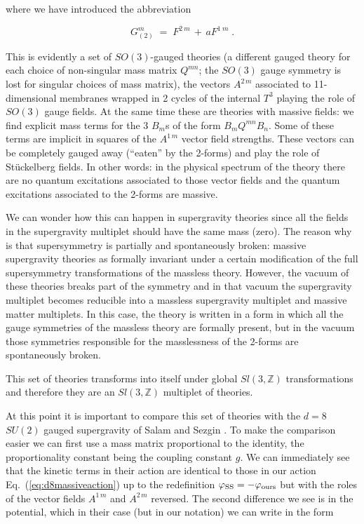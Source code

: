 \documentclass[12pt,a4paper]{article}
\begin{document}
\noindent where we have introduced the abbreviation 

\begin{equation}
G_{(2)}^{m} \;=\; F^{2\ m}\,+\, a F^{1\ m} \; .
\end{equation}

This is evidently a set of $SO(3)$-gauged theories (a different gauged
theory for each choice of non-singular mass matrix $Q^{mn}$; the
$SO(3)$ gauge symmetry is lost for singular choices of mass matrix),
the vectors $A^{2\,m}$ associated to 11-dimensional membranes wrapped
in 2 cycles of the internal $T^{3}$ playing the role of $SO(3)$ gauge
fields.  At the same time these are theories with massive fields: we
find explicit mass terms for the 3 $B_{m}$s of the form
$B_{m}Q^{mn}B_{n}$.  Some of these terms are implicit in squares of
the $A^{1\,m}$ vector field strengths. These vectors can be completely
gauged away (``eaten'' by the 2-forms) and play the role of
St\"uckelberg fields. In other words: in the physical spectrum of the
theory there are no quantum excitations associated to those vector
fields and the quantum excitations associated to the 2-forms are
massive.

We can wonder how this can happen in supergravity theories since all
the fields in the supergravity multiplet should have the same mass
(zero). The reason why is that supersymmetry is partially and
spontaneously broken: massive supergravity theories as formally
invariant under a certain modification of the full supersymmetry
transformations of the massless theory. However, the vacuum of these
theories breaks part of the symmetry and in that vacuum the
supergravity multiplet becomes reducible into a massless supergravity
multiplet and massive matter multiplets. In this case, the theory is
written in a form in which all the gauge symmetries of the massless
theory are formally present, but in the vacuum those symmetries
responsible for the masslessness of the 2-forms are spontaneously
broken.

This set of theories transforms into itself under global
$Sl(3,\mathbb{Z})$ transformations and therefore they are an
$Sl(3,\mathbb{Z})$ multiplet of theories.

At this point it is important to compare this set of theories with the
$d=8$ $SU(2)$ gauged supergravity of Salam and Sezgin \cite{kn:SaSe}.
To make the comparison easier we can first use a mass matrix
proportional to the identity, the proportionality constant being the
coupling constant $g$. We can immediately see that the kinetic terms
in their action are identical to those in our action
Eq.~(\ref{eq:d8massiveaction}) up to the redefinition $\varphi_{\rm
  SS} =-\varphi_{\rm ours}$ but with the roles of the vector fields
$A^{1\,m}$ and $A^{2\,m}$ reversed. The second difference we see is in
the potential, which in their case (but in our notation) we can write
in the form
\end{document}

